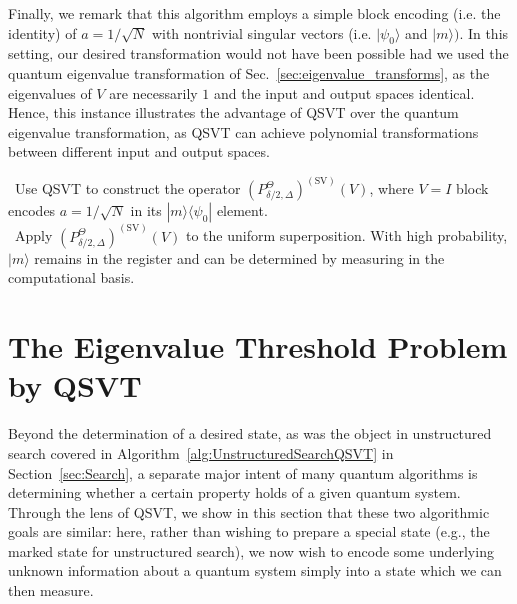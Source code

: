 \documentclass[aps,pra,showpacs,notitlepage,twocolumn,superscriptaddress,nofootinbib]{revtex4-1}
\begin{document}
    Finally, we remark that this algorithm employs a simple block encoding (i.e. the identity) of $a=1/\sqrt{N}$ with nontrivial singular vectors (i.e. $|\psi_0 \rangle$ and $|m\rangle)$. In this setting, our desired transformation would not have been possible had we used the quantum eigenvalue transformation of Sec.~\ref{sec:eigenvalue_transforms}, as the eigenvalues of $V$ are necessarily $1$ and the input and output spaces identical. Hence, this instance illustrates the advantage of QSVT over the quantum eigenvalue transformation, as QSVT can achieve polynomial transformations between different input and output spaces. 
    
    \begin{algorithm}[] 
        \Proc{}
        ~Use QSVT to construct the operator $(P^{\Theta}_{\delta/2,\Delta})^{(\text{SV})}(V)$, where $V=I$ block encodes $a=1/\sqrt{N}$ in its $|m\rangle\langle\psi_0|$ element. \\
        ~Apply $(P^{\Theta}_{\delta/2,\Delta})^{(\text{SV})}(V)$ to the uniform superposition. With high probability, $|m\rangle$ remains in the register and can be determined by measuring in the computational basis. 
        \caption{Unstructured Search by QSVT}
        \label{alg:UnstructuredSearchQSVT}
    \end{algorithm}

	
	
	

\section{The Eigenvalue Threshold Problem by QSVT} \label{sec:Threshold}
    Beyond the determination of a desired state, as was the object in unstructured search covered in Algorithm~\ref{alg:UnstructuredSearchQSVT} in Section~\ref{sec:Search}, a separate major intent of many quantum algorithms is determining whether a certain property holds of a given quantum system.  Through the lens of QSVT, we show in this section that these two algorithmic goals are similar: here, rather than wishing to prepare a special state (e.g., the marked state for unstructured search), we now wish to encode some underlying unknown information about a quantum system simply into a state which we can then measure.
        
\end{document}
